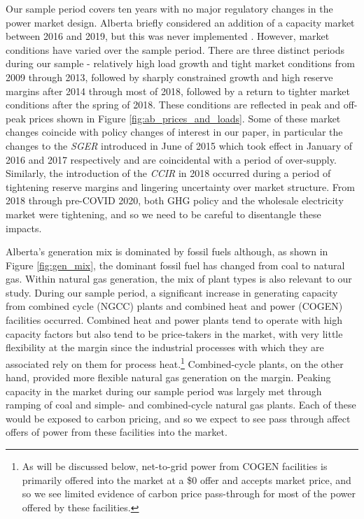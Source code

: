 \documentclass[12pt]{article}
\begin{document}
Our sample period covers ten years with no major regulatory changes in the power market design. Alberta briefly considered an addition of a capacity market between 2016 and 2019, but this was never implemented \cite{alberta_electricity_system_operator_capacity-market-brochurepdf_2017,alberta_electricity_system_operator_overview_2017}. However, market conditions have varied over the sample period. There are three distinct periods during our sample - relatively high load growth and tight market conditions from 2009 through 2013, followed by sharply constrained growth and high reserve margins after 2014 through most of 2018, followed by a return to tighter market conditions after the spring of 2018. These conditions are reflected in peak and off-peak prices shown in Figure \ref{fig:ab_prices_and_loads}. Some of these market changes coincide with policy changes of interest in our paper, in particular the changes to the \emph{SGER} introduced in June of 2015 which took effect in January of 2016 and 2017 respectively and are coincidental with a period of over-supply. Similarly, the introduction of the \emph{CCIR} in 2018 occurred during a period of tightening reserve margins and lingering uncertainty over market structure. From 2018 through pre-COVID 2020, both GHG policy and the wholesale electricity market were tightening, and so we need to be careful to disentangle these impacts.

Alberta's generation mix is dominated by fossil fuels although, as shown in Figure \ref{fig:gen_mix}, the dominant fossil fuel has changed from coal to natural gas. Within natural gas generation, the mix of plant types is also relevant to our study. During our sample period, a significant increase in generating capacity from combined cycle (NGCC) plants and combined heat and power (COGEN) facilities occurred. Combined heat and power plants tend to operate with high capacity factors but also tend to be price-takers in the market, with very little flexibility at the margin since the industrial processes with which they are associated rely on them for process heat.\footnote{As will be discussed below, net-to-grid power from COGEN facilities is primarily offered into the market at a \$0 offer and accepts market price, and so we see limited evidence of carbon price pass-through for most of the power offered by these facilities.} Combined-cycle plants, on the other hand, provided more flexible natural gas generation on the margin. Peaking capacity in the market during our sample period was largely met through ramping of coal and simple- and combined-cycle natural gas plants. Each of these would be exposed to carbon pricing, and so we expect to see pass through affect offers of power from these facilities into the market.
\end{document}
